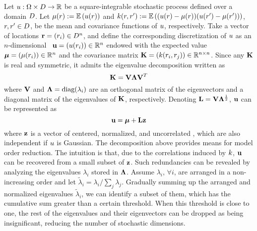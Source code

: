 Let $u: \Omega \times D \to \mathbb{R}$ be a square-integrable stochastic process defined over a domain $D$. Let $\fMean{\r} := \E{\u(\r)}$ and $\fCov{\r, \r'} := \E{(\u(\r) - \fMean{\r}) (\u(\r') - \fMean{\r'})}$, $r, r' \in D$, be the mean and covariance functions of $u$, respectively. Take a vector of locations $\mathbf{r} = (r_i) \in D^n$, and define the corresponding discretization of $u$ as an $n$-dimensional \rv\ $\mathbf{u} = (u(r_i)) \in \mathbb{R}^n$ endowed with the expected value $\vmean = (\fMean{\r_i}) \in \real^n$ and the covariance matrix $\mCov = (\fCov{\r_i, \r_j}) \in \real^{n \times n}$. Since any $\mathbf{K}$ is real and symmetric, it admits the eigenvalue decomposition \cite{press2007} written as
\[
  \mathbf{K} = \mathbf{V} \mathbf{\Lambda} \mathbf{V}^T
\]
where $\mathbf{V}$ and $\mathbf{\Lambda} = \text{diag}(\lambda_i)$ are an orthogonal matrix of the eigenvectors and a diagonal matrix of the eigenvalues of $\mathbf{K}$, respectively. Denoting $\mathbf{L} = \mathbf{V} \mathbf{\Lambda}^\frac{1}{2}$, $\mathbf{u}$ can be represented as
\begin{equation} \elabel{kl-expansion}
  \vu = \vmean + \mKL \vz
\end{equation}
where $\mathbf{z}$ is a vector of centered, normalized, and uncorrelated \rvs, which are also independent if $u$ is Gaussian.
The decomposition above provides means for model order reduction. The intuition is that, due to the correlations induced by $\fCov$, $\mathbf{u}$ can be recovered from a small subset of $\mathbf{z}$. Such redundancies can be revealed by analyzing the eigenvalues $\lambda_i$ stored in $\mathbf{\Lambda}$.
Assume $\lambda_i$, $\forall i$, are arranged in a non-increasing order and let $\tilde{\lambda}_i = \lambda_i / \sum_j \lambda_j$. Gradually summing up the arranged and normalized eigenvalues $\tilde{\lambda}_i$, we can identify a subset of them, which has the cumulative sum greater than a certain threshold.
When this threshold is close to one, the rest of the eigenvalues and their eigenvectors can be dropped as being insignificant, reducing the number of stochastic dimensions.
